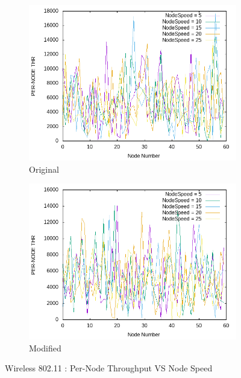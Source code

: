     \begin{figure}[!h] 
    	\centering
    	
    	\begin{subfigure}{0.9\textwidth} %
    		\includegraphics[width=.98\textwidth]{Pictures/Wireless802.11Mobile/Original/PER-NODETHRVSNodeSpeed.png}
    		 \caption{Original} %
    	\end{subfigure}
    	
    	\vspace{1em} %
    	
    	\begin{subfigure}{0.9\textwidth} %
    		\includegraphics[width=.98\textwidth]{Pictures/Wireless802.11Mobile/Modified/PER-NODETHRVSNodeSpeed.png}
    		 \caption{ Modified} %
    	\end{subfigure}
    	
    	 \caption{Wireless 802.11 : Per-Node Throughput VS Node Speed} %
    \end{figure}
    